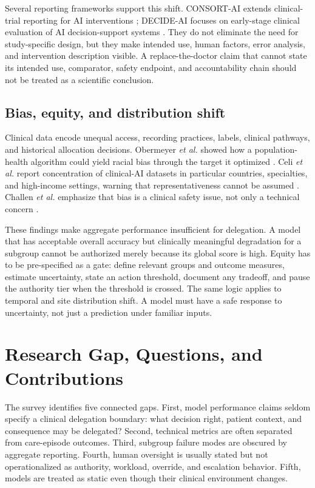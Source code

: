 \documentclass[conference]{IEEEtran}
\begin{document}
Several reporting frameworks support this shift. CONSORT-AI extends clinical-trial reporting for AI interventions \cite{liu2020}; DECIDE-AI focuses on early-stage clinical evaluation of AI decision-support systems \cite{vasey2022}. They do not eliminate the need for study-specific design, but they make intended use, human factors, error analysis, and intervention description visible. A replace-the-doctor claim that cannot state its intended use, comparator, safety endpoint, and accountability chain should not be treated as a scientific conclusion.

\subsection{Bias, equity, and distribution shift}

Clinical data encode unequal access, recording practices, labels, clinical pathways, and historical allocation decisions. Obermeyer \textit{et al.} showed how a population-health algorithm could yield racial bias through the target it optimized \cite{obermeyer2019}. Celi \textit{et al.} report concentration of clinical-AI datasets in particular countries, specialties, and high-income settings, warning that representativeness cannot be assumed \cite{celi2022}. Challen \textit{et al.} emphasize that bias is a clinical safety issue, not only a technical concern \cite{challen2019}.

These findings make aggregate performance insufficient for delegation. A model that has acceptable overall accuracy but clinically meaningful degradation for a subgroup cannot be authorized merely because its global score is high. Equity has to be pre-specified as a gate: define relevant groups and outcome measures, estimate uncertainty, state an action threshold, document any tradeoff, and pause the authority tier when the threshold is crossed. The same logic applies to temporal and site distribution shift. A model must have a safe response to uncertainty, not just a prediction under familiar inputs.

\section{Research Gap, Questions, and Contributions}

The survey identifies five connected gaps. First, model performance claims seldom specify a clinical delegation boundary: what decision right, patient context, and consequence may be delegated? Second, technical metrics are often separated from care-episode outcomes. Third, subgroup failure modes are obscured by aggregate reporting. Fourth, human oversight is usually stated but not operationalized as authority, workload, override, and escalation behavior. Fifth, models are treated as static even though their clinical environment changes.
\end{document}
